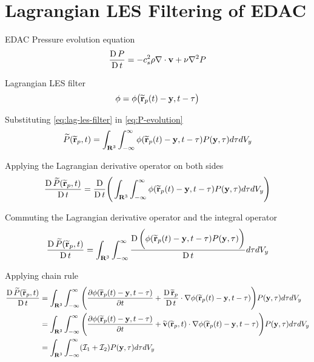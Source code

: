 \chapter{Lagrangian LES Filtering of EDAC} %

\label{AppendixA} %

\newcommand{\IntD}{d \tau d V_y}
\newcommand{\TilePArgRp}{\TildeP(\TildeR_p, t)}
\newcommand{\PhiRY}{\phi (\TildeR_p(t)-\vect{y}, t-\tau)}
\newcommand{\PY}{P(\vect{y}, \tau)}
\newcommand{\VY}{\vect{v}(\vect{y}, \tau)}
\newcommand{\TildeVArgRp}{\TildeV (\TildeR_p, t)}

EDAC Pressure evolution equation
\begin{equation}
    \frac{\operatorname{D} P}{\operatorname{D} t} = -c_s^2 \rho \nabla \cdot \mathbf{v} + \nu \nabla^2 P
    \label{eq:P-evolution}
\end{equation}

Lagrangian LES filter \parencite{DiMascio2017}
\begin{equation}
    \phi = \phi\big(\widetilde{\mathbf{r}}_p(t)-\mathbf{y}, t-\tau  \big)
    \label{eq:lag-les-filter}
\end{equation}

Substituting \ref{eq:lag-les-filter} in \ref{eq:P-evolution}
\begin{equation}
     \TilePArgRp = \IntRThreeAndT \PhiRY \PY \IntD
\end{equation}

Applying the Lagrangian derivative operator on both sides
\begin{equation}
     \LagDerivative{\TilePArgRp} = \LagDerivative{} \Bigg( \IntRThreeAndT \PhiRY \PY \IntD \Bigg)
\end{equation}

Commuting the Lagrangian derivative operator and the integral operator
\begin{equation}
    \LagDerivative{\TilePArgRp} = \IntRThreeAndT \LagDerivative{\bigg(\PhiRY \PY\bigg)} \IntD
\end{equation}

Applying chain rule
\begin{equation}
    \begin{split}
        \LagDerivative{\TilePArgRp} & = \IntRThreeAndT \Bigg( \PartialDerivative{\PhiRY} + \LagDerivative{\TildeR_p} \cdot \nabla \PhiRY \Bigg) \PY \IntD \\
        & = \IntRThreeAndT \Bigg( \PartialDerivative{\PhiRY} + \TildeVArgRp \cdot \nabla \PhiRY \Bigg) \PY \IntD \\
        & = \IntRThreeAndT (\mathcal{I}_1 + \mathcal{I}_2) \PY \IntD
    \end{split}
    \label{eq:integral-phi-complex}
\end{equation}


